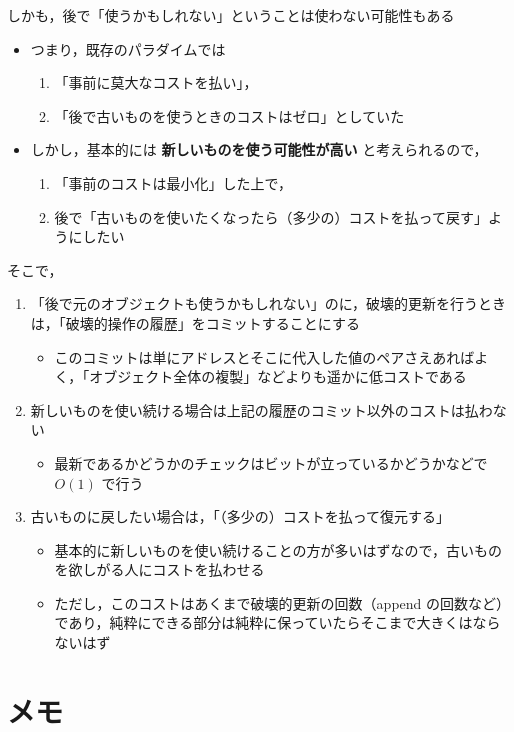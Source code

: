 \documentclass[10pt, a4j, twocolumn]{scrartcl}
\begin{document}
しかも，後で「使うかもしれない」ということは使わない可能性もある
\begin{itemize}
\item つまり，既存のパラダイムでは
\begin{enumerate}
\item 「事前に莫大なコストを払い」，
\item 「後で古いものを使うときのコストはゼロ」としていた
\end{enumerate}
\item しかし，基本的には \textbf{\textbf{新しいものを使う可能性が高い}} と考えられるので，
\begin{enumerate}
\item 「事前のコストは最小化」した上で，
\item 後で「古いものを使いたくなったら（多少の）コストを払って戻す」ようにしたい
\end{enumerate}
\end{itemize}


そこで，
\begin{enumerate}
\item 「後で元のオブジェクトも使うかもしれない」のに，破壊的更新を行うときは，「破壊的操作の履歴」をコミットすることにする
\begin{itemize}
\item このコミットは単にアドレスとそこに代入した値のペアさえあればよく，「オブジェクト全体の複製」などよりも遥かに低コストである
\end{itemize}
\item 新しいものを使い続ける場合は上記の履歴のコミット以外のコストは払わない
\begin{itemize}
\item 最新であるかどうかのチェックはビットが立っているかどうかなどで \(O(1)\) で行う
\end{itemize}
\item 古いものに戻したい場合は，「（多少の）コストを払って復元する」
\begin{itemize}
\item 基本的に新しいものを使い続けることの方が多いはずなので，古いものを欲しがる人にコストを払わせる
\item ただし，このコストはあくまで破壊的更新の回数（append の回数など）であり，純粋にできる部分は純粋に保っていたらそこまで大きくはならないはず
\end{itemize}
\end{enumerate}



\section{メモ}
\label{sec:orgba5dcdc}
\end{document}
